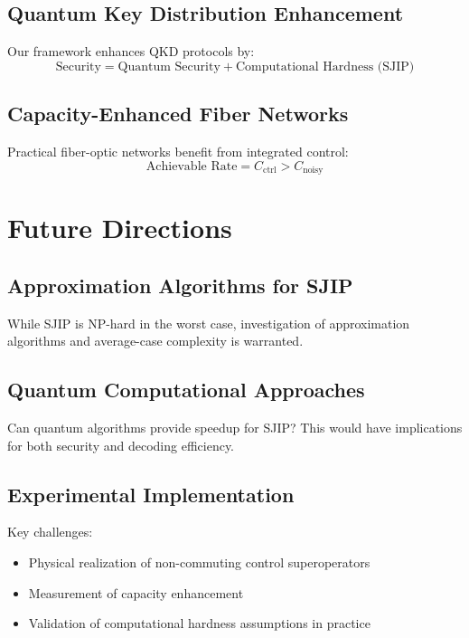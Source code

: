 \documentclass[12pt,a4paper]{article}
\begin{document}
\subsection{Quantum Key Distribution Enhancement}

Our framework enhances QKD protocols by:
\begin{equation}
\text{Security} = \text{Quantum Security} + \text{Computational Hardness (SJIP)}
\end{equation}

\subsection{Capacity-Enhanced Fiber Networks}

Practical fiber-optic networks benefit from integrated control:
\begin{equation}
\text{Achievable Rate} = C_{\text{ctrl}} > C_{\text{noisy}}
\end{equation}

\section{Future Directions}

\subsection{Approximation Algorithms for SJIP}

While SJIP is NP-hard in the worst case, investigation of approximation algorithms and average-case complexity is warranted.

\subsection{Quantum Computational Approaches}

Can quantum algorithms provide speedup for SJIP? This would have implications for both security and decoding efficiency.

\subsection{Experimental Implementation}

Key challenges:
\begin{itemize}
\item Physical realization of non-commuting control superoperators
\item Measurement of capacity enhancement
\item Validation of computational hardness assumptions in practice
\end{itemize}
\end{document}

